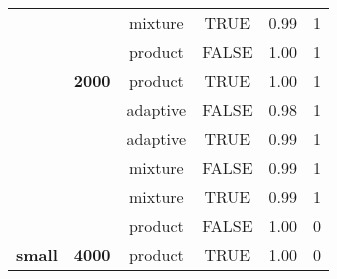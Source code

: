 \documentclass[
]{article}
\begin{document}
\begin{tabular}[t]{>{}c>{}ccccc}
 &  & mixture & TRUE & 0.99 & 1\\

 &  & product & FALSE & 1.00 & 1\\

 & \multirow{-6}{*}{\centering\arraybackslash \textbf{2000}} & product & TRUE & 1.00 & 1\\

 &  & adaptive & FALSE & 0.98 & 1\\

 &  & adaptive & TRUE & 0.99 & 1\\

 &  & mixture & FALSE & 0.99 & 1\\

 &  & mixture & TRUE & 0.99 & 1\\

 &  & product & FALSE & 1.00 & 0\\

\multirow{-24}{*}{\centering\arraybackslash \textbf{small}} & \multirow{-6}{*}{\centering\arraybackslash \textbf{4000}} & product & TRUE & 1.00 & 0\\
\bottomrule
\end{tabular}
\end{document}
